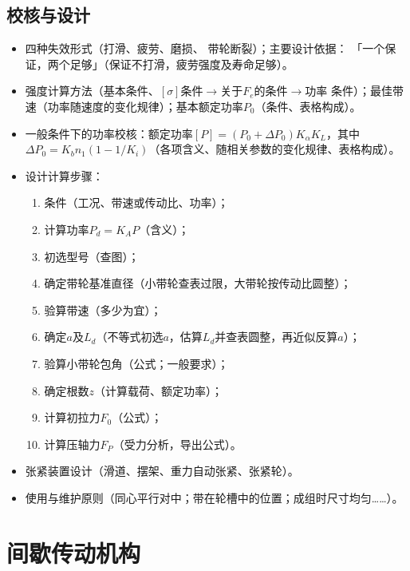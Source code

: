 \documentclass[12pt,a4paper]{article}
\newcommand{\tightlist}{\setlength{\parskip}{0pt}\setlength{\itemsep}{0pt}}
\newcommand{\hint}[1]{\textsf{（#1）}}
\newcommand{\minor}[1]{{\color{gray} #1}}
\newcommand{\then}{$\to$}
\begin{document}
\subsection{校核与设计}
\begin{itemize}\tightlist
    \item 四种失效形式\hint{打滑、疲劳、磨损、\minor{带轮断裂}}；主要设计依据：
    「一个保证，两个足够」\hint{保证不打滑，疲劳强度及寿命足够}。
    \item 强度计算方法\hint{基本条件、$[\sigma]$条件\then 关于$F_e$的条件\then 功率
    条件}；最佳带速\hint{功率随速度的变化规律}；基本额定功率$P_0$\hint{条件、表格构成}。
    \item 一般条件下的功率校核：额定功率$[P]=(P_0+\Delta P_0)K_\alpha K_L$，其中
    $\Delta P_0=K_bn_1(1-1/K_i)$\hint{各项含义、随相关参数的变化规律、表格构成}。
    \item 设计计算步骤：
    \begin{enumerate}\tightlist
        \item 条件\hint{工况、带速或传动比、功率}；
        \item 计算功率$P_d=K_AP$\hint{含义}；
        \item 初选型号\hint{查图}；
        \item 确定带轮基准直径\hint{小带轮查表过限，大带轮按传动比圆整}；
        \item 验算带速\hint{多少为宜}；
        \item 确定$a$及$L_d$\hint{不等式初选$a$，估算$L_d$并查表圆整，再近似反算$a$}；
        \item 验算小带轮包角\hint{公式；一般要求}；
        \item 确定根数$z$\hint{计算载荷、额定功率}；
        \item 计算初拉力$F_0$\hint{公式}；
        \item 计算压轴力$F_P$\hint{受力分析，导出公式}。
    \end{enumerate}
    \item \minor{张紧装置设计\hint{滑道、摆架、重力自动张紧、张紧轮}。}
    \item 使用与维护原则\hint{同心平行对中；带在轮槽中的位置；成组时尺寸均匀……}。
\end{itemize}

\section{间歇传动机构}
\end{document}
